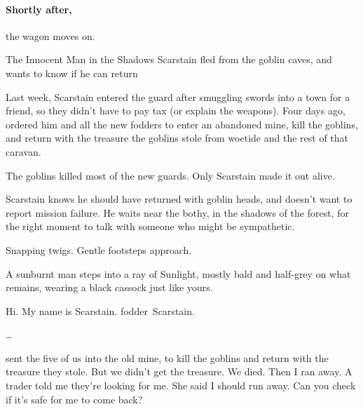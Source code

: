 \begin{multicols}{2}
\paragraph{Shortly after,}
the wagon moves on.

{The Innocent Man in the Shadows}%
{ Scarstain fled from the goblin caves, and wants to know if he can return}%

\begin{exampletext}
  Last week, Scarstain entered the \gls{guard} after smuggling swords into a town for a friend, so they didn't have to pay tax (or explain the \glspl{weapon}).
  Four days ago,  ordered him and all the new \glspl{fodder} to enter an abandoned mine, kill the goblins, and return with the treasure the goblins stole from \gls{woetide} and the rest of that caravan.

  The goblins killed most of the new \glspl{guard}.
  Only Scarstain made it out alive.
\end{exampletext}

Scarstain knows he should have returned with goblin heads, and doesn't want to report mission failure.
He waits near the \gls{bothy}, in the shadows of the forest, for the right moment to talk with someone who might be sympathetic.

\begin{boxtext}
  Snapping twigs.
  Gentle footsteps approach.
\end{boxtext}


\begin{boxtext}
  A sunburnt man steps into a ray of Sunlight, mostly bald and half-grey on what remains, wearing a black cassock just like yours.

  \begin{speechtext}
    Hi.
    My name is Scarstain.
    \Gls{fodder}~Scarstain.

    \ldots

     sent the five of us into the old mine, to kill the goblins and return with the treasure they stole.
    But we didn't get the treasure.
    We died.
    Then I ran away.
    A trader told me they're looking for me.
    She said I should run away.
    Can you check if it's safe for me to come back?
  \end{speechtext}


\end{boxtext}
\end{multicols}
